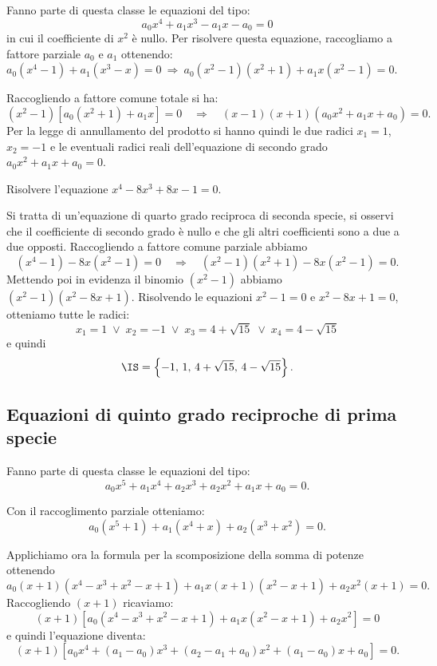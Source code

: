 Fanno parte di questa classe le equazioni del tipo: \[a_0x^4+a_1x^3-a_1x-a_0=0\] in cui il coefficiente di $x^2$ è nullo. Per risolvere questa equazione, raccogliamo a fattore parziale $a_0$ e $a_1$ ottenendo: $a_0\left(x^4-1\right)+a_1\left(x^3-x\right)=0 \:\Rightarrow\: a_0\left(x^2-1\right)\left(x^2+1\right)+a_1x\left(x^2-1\right)=0$.

Raccogliendo a fattore comune totale si ha:
\[\left(x^2-1\right)\left[a_0\left(x^2+1\right)+a_1x\right]=0\quad\Rightarrow \quad\left(x-1\right)\left(x+1\right)\left(a_0x^2+a_1x+a_0\right)=0.\]
Per la legge di annullamento del prodotto si hanno quindi le due radici $x_1=1$, $x_2=-1$ e le eventuali radici reali dell'equazione di secondo grado $a_0x^2+a_1x+a_0=0$.
\begin{exrig}
 \begin{esempio}
 Risolvere l'equazione $x^4-8x^3+8x-1=0$.

 Si tratta di un'equazione di quarto grado reciproca di seconda specie, si osservi che il coefficiente di secondo grado è nullo e che gli altri coefficienti sono a due a due opposti.
 Raccogliendo a fattore comune parziale abbiamo 
\[(x^4-1)-8x(x^2-1)=0\quad\Rightarrow\quad (x^2-1)(x^2+1)-8x(x^2-1)=0.\]
 Mettendo poi in evidenza il binomio $\left(x^2-1\right)$ abbiamo $\left(x^2-1\right)\left(x^2-8x+1\right)$. Risolvendo le equazioni $x^2-1=0$ e $x^2-8x+1=0$, otteniamo tutte le radici: 
\[x_1=1\;\vee\; x_2=-1\;\vee\; x_3=4+\sqrt{15}\;\vee\; x_4=4-\sqrt{15}\] 
e quindi 
\[\IS=\left\{-1\text{, }1\text{, }4+\sqrt{15}\text{, }4-\sqrt{15}\right\}.\]
 \end{esempio}
\end{exrig}
\ovalbox{\risolvii \ref{ese:5.47}, \ref{ese:5.48}, \ref{ese:5.49}, \ref{ese:5.50}, \ref{ese:5.51}}

\subsection{Equazioni di quinto grado reciproche di prima specie}

Fanno parte di questa classe le equazioni del tipo: \[a_0x^5+a_1x^4+a_2x^3+a_2x^2+a_1x+a_0=0.\]

Con il raccoglimento parziale otteniamo: 
\[a_0\left(x^5+1\right)+a_1\left(x^4+x\right)+a_2\left(x^3+x^2\right)=0.\]

Applichiamo ora la formula per la scomposizione della somma di potenze ottenendo
\[a_0(x+1)\left(x^4-x^3+x^2-x+1\right)+a_1x(x+1)\left(x^2-x+1\right)+a_2x^2(x+1)=0.\]
Raccogliendo $(x+1)$ ricaviamo: 
\[(x+1)\left[a_0\left(x^4-x^3+x^2-x+1\right)+a_1x\left(x^2-x+1\right)+a_2x^2\right]=0\]
e quindi l'equazione diventa:
\[(x+1)\left[a_0x^4+(a_1-a_0)x^3+(a_2-a_1+a_0)x^2+(a_1-a_0)x+a_0\right]=0.\]

